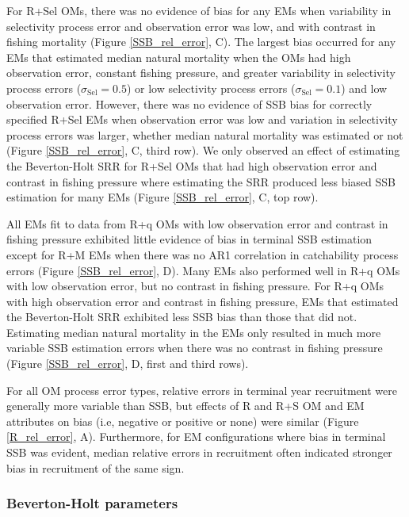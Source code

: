 \documentclass[
  12pt,
]{article}
\begin{document}
For R+Sel OMs, there was no evidence of bias for any EMs when
variability in selectivity process error and observation error was low,
and with contrast in fishing mortality (Figure \ref{SSB_rel_error}, C).
The largest bias occurred for any EMs that estimated median natural
mortality when the OMs had high observation error, constant fishing
pressure, and greater variability in selectivity process errors
(\(\sigma_{\text{Sel}} = 0.5\)) or low selectivity process errors
(\(\sigma_{\text{Sel}} = 0.1\)) and low observation error. However,
there was no evidence of SSB bias for correctly specified R+Sel EMs when
observation error was low and variation in selectivity process errors
was larger, whether median natural mortality was estimated or not
(Figure \ref{SSB_rel_error}, C, third row). We only observed an effect
of estimating the Beverton-Holt SRR for R+Sel OMs that had high
observation error and contrast in fishing pressure where estimating the
SRR produced less biased SSB estimation for many EMs (Figure
\ref{SSB_rel_error}, C, top row).

All EMs fit to data from R+q OMs with low observation error and contrast
in fishing pressure exhibited little evidence of bias in terminal SSB
estimation except for R+M EMs when there was no AR1 correlation in
catchability process errors (Figure \ref{SSB_rel_error}, D). Many EMs
also performed well in R+q OMs with low observation error, but no
contrast in fishing pressure. For R+q OMs with high observation error
and contrast in fishing pressure, EMs that estimated the Beverton-Holt
SRR exhibited less SSB bias than those that did not. Estimating median
natural mortality in the EMs only resulted in much more variable SSB
estimation errors when there was no contrast in fishing pressure (Figure
\ref{SSB_rel_error}, D, first and third rows).

For all OM process error types, relative errors in terminal year
recruitment were generally more variable than SSB, but effects of R and
R+S OM and EM attributes on bias (i.e, negative or positive or none)
were similar (Figure \ref{R_rel_error}, A). Furthermore, for EM
configurations where bias in terminal SSB was evident, median relative
errors in recruitment often indicated stronger bias in recruitment of
the same sign.

\hypertarget{beverton-holt-parameters}{%
\subsubsection*{Beverton-Holt
parameters}\label{beverton-holt-parameters}}
\end{document}
